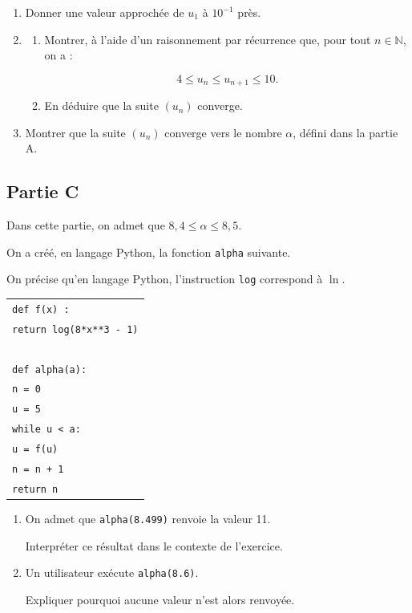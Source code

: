 \documentclass[10pt]{article}
\begin{document}
\medskip

\begin{enumerate}
\item Donner une valeur approchée de $u_1$ à $10^{-1}$ près.
\item[2.] 
	\begin{enumerate}[label=\alph*.]
		\item Montrer, à l'aide d'un raisonnement par récurrence que, pour tout $n \in \mathbb{N}$, on a :
		
\[4 \leqslant u_n \leqslant u_{n+1} \leqslant 10.\]
		\item En déduire que la suite $(u_n)$ converge.
	\end{enumerate}
\item[3.] Montrer que la suite $(u_n)$ converge vers le nombre $\alpha$, défini dans la partie A.
\end{enumerate}

\subsection*{Partie C}

Dans cette partie, on admet que $8{,}4 \leqslant \alpha \leqslant 8{,}5$.

On a créé, en langage Python, la fonction \texttt{alpha} suivante.

On précise qu'en langage Python, l'instruction \texttt{log} correspond à $\ln$.


\begin{center}
\begin{tabular}{|l|}\hline
\texttt{def f(x) :}\\
\quad \texttt{return log(8*x**3 - 1)}\\
~\\
\texttt{def alpha(a):}\\
\quad \texttt{n = 0}\\
\quad \texttt{u = 5}\\
\quad \texttt{while u < a:}\\
\quad \quad \texttt{u = f(u)}\\
\quad \quad \texttt{n = n + 1}\\
\quad \texttt{return n}\\ \hline
\end{tabular}
\end{center}


\medskip

\begin{enumerate}
\item On admet que \texttt{alpha(8.499)} renvoie la valeur 11.

Interpréter ce résultat dans le contexte de l'exercice.
\item Un utilisateur exécute \texttt{alpha(8.6)}.

Expliquer pourquoi aucune valeur n'est alors renvoyée.
\end{enumerate}

\bigskip
\end{document}
